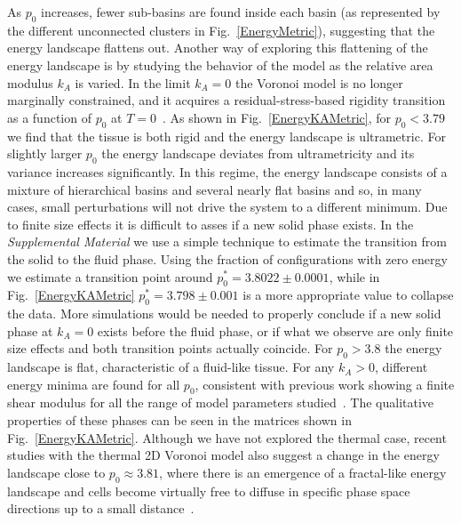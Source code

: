 \documentclass[reprint,amsmath,amssymb,aps]{revtex4-2}
\begin{document}
As $p_0$ increases, fewer sub-basins are found inside each basin (as represented by the different unconnected clusters in Fig.~\ref{EnergyMetric}), suggesting that the energy landscape flattens out. Another way of exploring this flattening of the energy landscape is by studying the behavior of the model as the relative area modulus $k_A$ is varied. In the limit $k_A=0$ the Voronoi model is no longer marginally constrained, and it acquires a residual-stress-based rigidity transition as a function of $p_0$ at $T=0$~\cite{Sussman2018}. As shown in Fig.~\ref{EnergyKAMetric}, for $p_0<3.79$ we find that the tissue is both rigid and the energy landscape is ultrametric. For slightly larger $p_0$ the energy landscape deviates from ultrametricity and its variance increases significantly. In this regime, the energy landscape consists of a mixture of hierarchical basins and several nearly flat basins and so, in many cases, small perturbations will not drive the system to a different minimum. Due to finite size effects it is difficult to asses if a new solid phase exists. In the \textit{Supplemental Material} we use a simple technique to estimate the transition from the solid to the fluid phase. Using the fraction of configurations with zero energy we estimate a transition point around $p_0^*=3.8022\pm0.0001$, while in Fig.~\ref{EnergyKAMetric} $p_0^*=3.798\pm 0.001$ is a more appropriate value to collapse the data. More simulations would be needed to properly conclude if a new solid phase at $k_A=0$ exists before the fluid phase, or if what we observe are only finite size effects and both transition points actually coincide. For $p_0>3.8$ the energy landscape is flat, characteristic of a fluid-like tissue. For any $k_A>0$, different energy minima are found for all $p_0$, consistent with previous work showing a finite shear modulus for all the range of model parameters studied~\cite{Sussman2018}. The qualitative properties of these phases can be seen in the matrices shown in Fig.~\ref{EnergyKAMetric}. Although we have not explored the thermal case, recent studies with the thermal 2D Voronoi model also suggest a change in the energy landscape close to $p_0\approx3.81$, where there is an emergence of a fractal-like energy landscape and cells become virtually free to diffuse in specific phase space directions up to a small distance~\cite{Li2021}.
\end{document}
